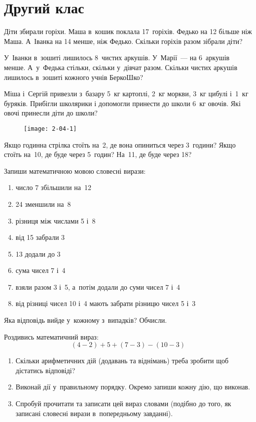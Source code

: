 \chapter{Другий клас}

\problem
Діти збирали горіхи. Маша в~кошик поклала 17~горіхів.
Федько на 12 більше ніж Маша. А~Іванка на 14 менше, ніж Федько.
Скільки горіхів разом зібрали діти?


\problem
У~Іванки в~зошиті лишилось 8~чистих аркушів.
У~Марії~--- на 6~аркушів менше.
А~у~Федька стільки, скільки у~дівчат разом.
Скільки чистих аркушів лишилось в~зошиті кожного учнів БеркоШко?


\problem
Міша і~Сергій привезли з~базару 5~кг картоплі, 2~кг моркви,
3~кг цибулі і~1~кг буряків.
Прибігли школярики і допомогли принести до школи 6~кг овочів.
Які овочі принесли діти до школи?


\problem
{}

\begin{figure}[h]
    \centering
    \texttt{[image: 2-04-1]}
\end{figure}

Якщо годинна стрілка стоїть на~2, де вона опиниться через 3~години?
Якщо стоїть на~10, де буде через 5~годин?
На~11, де буде через 18?


\problem
Запиши математичною мовою словесні вирази:
\begin{enumerate}
    \item число 7 збільшили на~12
    \item 24 зменшили на~8
    \item різниця між числами 5 і~8
    \item від 15 забрали 3
    \item 13 додали до 3
    \item сума чисел 7 і~4
    \item взяли разом 3 і~5, а~потім додали до суми чисел 7 і~4
    \item від різниці чисел 10 і~4 мають забрати різницю чисел 5 і~3
\end{enumerate}
Яка відповідь вийде у~кожному з~випадків? Обчисли.


\problem
Роздивись математичний вираз:
\[
(4 - 2) + 5 + (7 - 3) - (10 - 3)
\]
\begin{enumerate}
    \item Скільки арифметичних дій (додавань та віднімань)
    треба зробити щоб дістатись відповіді?
    \item Виконай дії у~правильному порядку.
    Окремо запиши кожну дію, що виконав.
    \item Спробуй прочитати та записати цей вираз словами
    (подібно до того, як записані словесні вирази в~попередньому завданні).
\end{enumerate}



